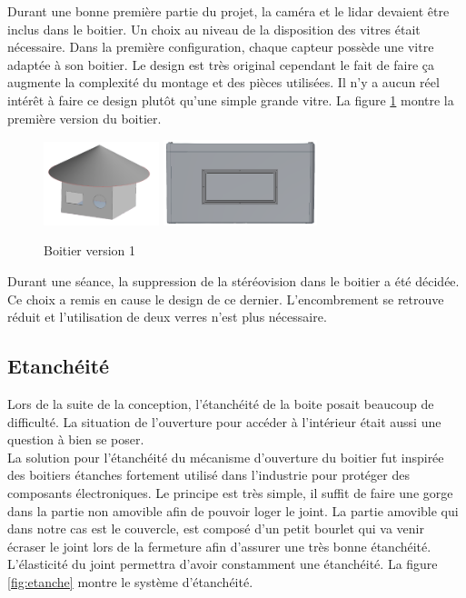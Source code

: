Durant une bonne première partie du projet, la caméra et le lidar devaient être inclus dans le boitier. 
Un choix au niveau de la disposition des vitres était nécessaire. Dans la première configuration, chaque 
capteur possède une vitre adaptée à son boitier. Le design est très original cependant le fait de faire 
ça augmente la complexité du montage et des pièces utilisées. Il n’y a aucun réel intérêt à faire ce design 
plutôt qu’une simple grande vitre. La figure \ref{fig:boitierv1} montre la première version du boitier.

\begin{figure}[H]
    \centering
    \includegraphics[width=0.3\textwidth]{Images/photos_PGA/Boiterv1.PNG}
    \includegraphics[width=0.4\textwidth]{Images/photos_PGA/boitierv2.PNG}
    \caption{Boitier version 1}
    \label{fig:boitierv1}
\end{figure}

Durant une séance, la suppression de la stéréovision dans le boitier a été décidée. Ce choix a remis en cause 
le design de ce dernier. L’encombrement se retrouve réduit et l’utilisation de deux verres n’est plus 
nécessaire. 

\subsection{Etanchéité}

Lors de la suite de la conception, l’étanchéité de la boite posait beaucoup de difficulté. La situation de 
l’ouverture pour accéder à l’intérieur était aussi une question à bien se poser.\\
La solution pour l’étanchéité du mécanisme d’ouverture du boitier fut inspirée des boitiers étanches fortement 
utilisé dans l’industrie pour protéger des composants électroniques. Le principe est très simple, il suffit 
de faire une gorge dans la partie non amovible afin de pouvoir loger le joint. La partie amovible qui dans 
notre cas est le couvercle, est composé d’un petit bourlet qui va venir écraser le joint lors de la fermeture 
afin d’assurer une très bonne étanchéité. L’élasticité du joint permettra d’avoir constamment une étanchéité.
La figure \ref{fig:etanche} montre le système d'étanchéité.

